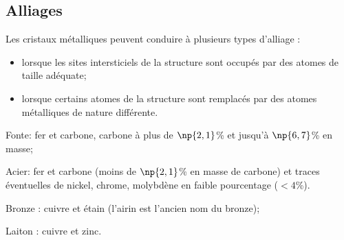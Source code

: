 \subsection*{Alliages}
Les cristaux métalliques peuvent conduire à plusieurs types
d'alliage :
\begin{itemize}
    \item lorsque les sites intersticiels de la structure sont
        occupés par des atomes de taille adéquate;
    \item lorsque certains atomes de la structure sont remplacés
        par des atomes métalliques de nature différente.
\end{itemize}
\begin{ex}
    \begin{compactitem}
    \item Fonte: fer et carbone, carbone à plus de $\np{2,1}$\%
            et jusqu'à $\np{6,7}$\% en masse;
        \item Acier: fer et carbone (moins de $\np{2,1}$\% en masse
            de carbone) et traces éventuelles de nickel, chrome,
            molybdène en faible pourcentage ($<4$\%).
        \end{compactitem}
\end{ex}
\begin{ex}
    \begin{compactitem}
        \item Bronze : cuivre et étain (l'airin est l'ancien nom
            du bronze);
        \item Laiton : cuivre et zinc.
    \end{compactitem}
\end{ex}
